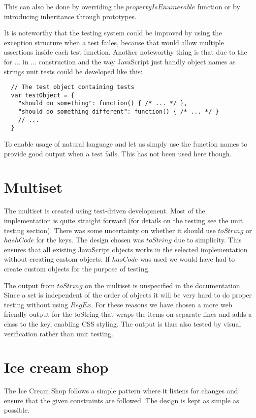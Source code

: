 \documentclass[a4paper,10pt]{article}
\begin{document}
This can also be done by overriding the $propertyIsEnumerable$
function or by introducing inheritance through prototypes.

It is noteworthy that the testing system could be improved by using
the exception structure when a test failes, because that would allow
multiple assertions inside each test function.  Another noteworthy
thing is that due to the for ... in ... construction and the way
JavaScript just handly object names as strings unit tests could be
developed like this:

\begin{verbatim}
  // The test object containing tests
  var testObject = {
    "should do something": function() { /* ... */ },
    "should do something different": function() { /* ... */ }
    // ...
  }
\end{verbatim}

To enable usage of natural language and let us simply use the function
names to provide good output when a test fails.  This has not been
used here though.

\section*{Multiset}
The multiset is created using test-driven development.  Most of the
implementation is quite straight forward (for details on the testing
see the unit testing section).  There was some uncertainty on whether
it should use $toString$ or $hashCode$ for the keys.  The design
chosen was $toString$ due to simplicity.  This ensures that all
existing JavaScript objects works in the selected implementation
without creating custom objects.  If $hasCode$ was used we would have
had to create custom objects for the purpose of testing.

The output from $toString$ on the multiset is unspecified in the
documentation.  Since a set is independent of the order of objects it
will be very hard to do proper testing without using $RegEx$.  For
these reasons we have chosen a more web friendly output for the
toString that wraps the items on separate lines and adds a class to
the key, enabling CSS styling.  The output is thus also tested by
visual verification rather than unit testing.

\section*{Ice cream shop}
The Ice Cream Shop follows a simple pattern where it listens for
changes and ensure that the given constraints are followed.  The design is
kept as simple as possible.
\end{document}
